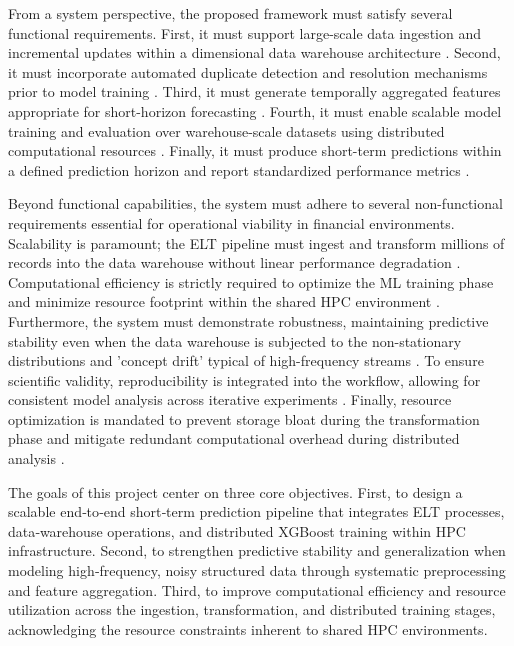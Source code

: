 \documentclass[conference]{IEEEtran}
\begin{document}
From a system perspective, the proposed framework must satisfy several functional requirements. First, it must support large-scale data ingestion and incremental updates within a dimensional data warehouse architecture \cite{kimball2013dwtoolkit}. Second, it must incorporate automated duplicate detection and resolution mechanisms prior to model training \cite{aggarwal2015datamining}. Third, it must generate temporally aggregated features appropriate for short-horizon forecasting \cite{lopezdeprado2018afml}. Fourth, it must enable scalable model training and evaluation over warehouse-scale datasets using distributed computational resources \cite{chen2016xgboost}. Finally, it must produce short-term predictions within a defined prediction horizon and report standardized performance metrics \cite{fawcett2006roc}.

Beyond functional capabilities, the system must adhere to several non-functional requirements essential for operational viability in financial environments. Scalability is paramount; the ELT pipeline must ingest and transform millions of records into the data warehouse without linear performance degradation \cite{tsay2010financial}. Computational efficiency is strictly required to optimize the ML training phase and minimize resource footprint within the shared HPC environment \cite{chen2016xgboost}. Furthermore, the system must demonstrate robustness, maintaining predictive stability even when the data warehouse is subjected to the non-stationary distributions and 'concept drift' typical of high-frequency streams \cite{widmer1996learning}. To ensure scientific validity, reproducibility is integrated into the workflow, allowing for consistent model analysis across iterative experiments \cite{peng2011reproducible}. Finally, resource optimization is mandated to prevent storage bloat during the transformation phase and mitigate redundant computational overhead during distributed analysis \cite{hwang2012distributed}.

The goals of this project center on three core objectives. First, to design a scalable end‑to‑end short‑term prediction pipeline that integrates ELT processes, data‑warehouse operations, and distributed XGBoost training within HPC infrastructure. Second, to strengthen predictive stability and generalization when modeling high‑frequency, noisy structured data through systematic preprocessing and feature aggregation. Third, to improve computational efficiency and resource utilization across the ingestion, transformation, and distributed training stages, acknowledging the resource constraints inherent to shared HPC environments.
\end{document}
